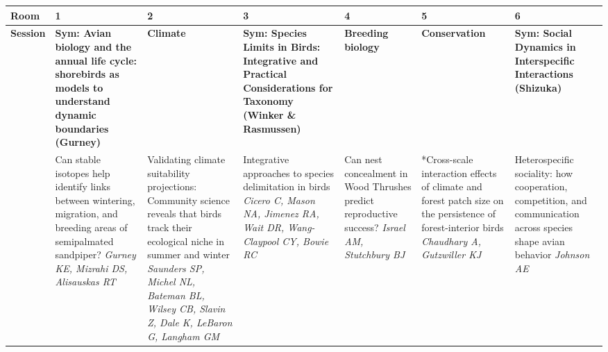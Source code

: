 \begin{tabular}{|x{0.75cm}|a{2.25cm}|x{2.25cm}|a{2.25cm}|x{2.25cm}|x{2.25cm}|a{2.25cm}|}\hline
Room & 1 & 2 & 3 & 4 & 5 & 6\\
\hline
\rule{0pt}{1em} \textbf{Session} &\footnotesize \textbf{Sym: Avian biology and the annual life cycle: shorebirds as models to understand dynamic boundaries (Gurney)} & \footnotesize \textbf{Climate} & \footnotesize \textbf{Sym: Species Limits in Birds: Integrative and Practical Considerations for Taxonomy (Winker \& Rasmussen)} & \footnotesize \textbf{Breeding biology} & \footnotesize \textbf{Conservation} & \footnotesize \textbf{Sym: Social Dynamics in Interspecific Interactions (Shizuka)}\\
\hline
{}&Can stable isotopes help identify links between wintering, migration, and breeding areas of semipalmated sandpiper? \newline \newline \textit{Gurney KE, Mizrahi DS, Alisauskas RT} & Validating climate suitability projections: Community science reveals that birds track their ecological niche in summer and winter \newline \newline \textit{Saunders SP, Michel NL, Bateman BL, Wilsey CB, Slavin Z, Dale K, LeBaron G, Langham GM} & Integrative approaches to species delimitation in birds \newline \newline \textit{Cicero C, Mason NA, Jimenez RA, Wait DR, Wang-Claypool CY, Bowie RC} & Can nest concealment in Wood Thrushes predict reproductive success? \newline \newline \textit{Israel AM, Stutchbury BJ} & *Cross-scale interaction effects of climate and forest patch size on the persistence of forest-interior birds \newline \newline \textit{Chaudhary A, Gutzwiller KJ} & Heterospecific sociality: how cooperation, competition, and communication across species shape avian behavior \newline \newline \textit{Johnson AE}\\
\hline

\end{tabular}
